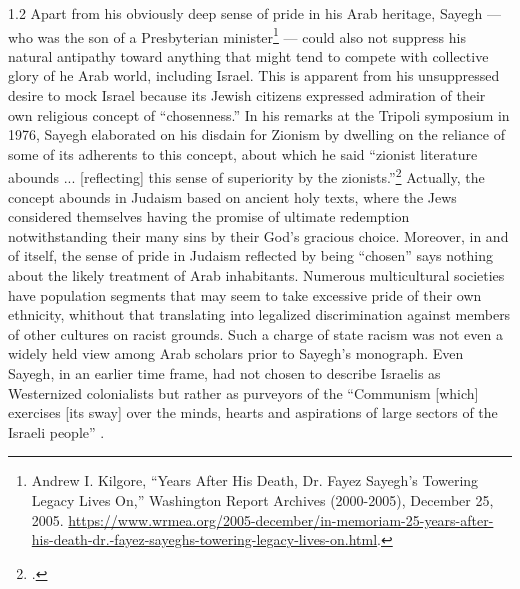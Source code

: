 \documentclass[../unravbook.tex]{subfiles}
\begin{document}
\begin{spacing}{1.2}
Apart from his obviously deep sense of pride in his Arab heritage, Sayegh --- who was the son of a Presbyterian minister\footnote{Andrew I. Kilgore, \enquote{Years After His Death, Dr. Fayez Sayegh's Towering Legacy Lives On,} Washington Report Archives (2000-2005), December 25, 2005. \url{https://www.wrmea.org/2005-december/in-memoriam-25-years-after-his-death-dr.-fayez-sayeghs-towering-legacy-lives-on.html}.
} --- could also not suppress his natural antipathy toward anything that might tend to compete with collective glory of he Arab world, including Israel. This is apparent from his unsuppressed desire to mock Israel because its Jewish citizens expressed admiration of their own religious concept of \enquote{chosenness.} In his remarks at the Tripoli symposium in 1976, Sayegh elaborated on his disdain for Zionism by dwelling on the reliance of some of its adherents to this concept, about which he said \enquote{zionist literature abounds ... [reflecting] this sense of superiority by the zionists.}\footcite[5-6.]{Sayegh-1982} Actually, the concept abounds in Judaism based on ancient holy texts, where the Jews considered themselves having the promise of ultimate redemption notwithstanding their many sins by their God's gracious choice. Moreover, in and of itself, the sense of pride in Judaism reflected by being \enquote{chosen} says nothing about the likely treatment of Arab inhabitants. Numerous multicultural societies have population segments that may seem to take excessive pride of their own ethnicity, whithout that translating into legalized discrimination against members of other cultures on racist grounds. Such a charge of state racism was not even a widely held view among Arab scholars prior to Sayegh's monograph. Even Sayegh, in an earlier time frame, had not chosen to describe Israelis as Westernized colonialists but rather as purveyors of the \enquote{Communism [which] exercises [its sway] over the minds, hearts and aspirations of large sectors of the Israeli people} \parencite{Sayegh-1958b}.


\end{spacing}
\end{document}

